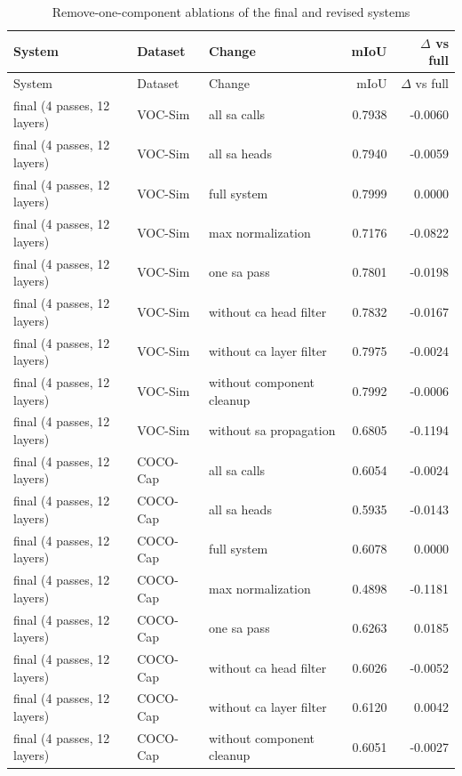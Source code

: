 {\scriptsize\setlength{\tabcolsep}{3pt}
\begin{longtable}{>{\raggedright\arraybackslash}p{4.94cm}>{\raggedright\arraybackslash}p{1.92cm}>{\raggedright\arraybackslash}p{4.68cm}rr}
\caption{Remove-one-component ablations of the final and revised systems}\label{tab:b_component_ablations}\\
\toprule
System & Dataset & Change & mIoU & $\Delta$ vs full \\
\midrule
\endfirsthead
\toprule
System & Dataset & Change & mIoU & $\Delta$ vs full \\
\midrule
\endhead
final (4 passes, 12 layers) & VOC-Sim & all sa calls & 0.7938 & -0.0060 \\
final (4 passes, 12 layers) & VOC-Sim & all sa heads & 0.7940 & -0.0059 \\
final (4 passes, 12 layers) & VOC-Sim & full system & 0.7999 & 0.0000 \\
final (4 passes, 12 layers) & VOC-Sim & max normalization & 0.7176 & -0.0822 \\
final (4 passes, 12 layers) & VOC-Sim & one sa pass & 0.7801 & -0.0198 \\
final (4 passes, 12 layers) & VOC-Sim & without ca head filter & 0.7832 & -0.0167 \\
final (4 passes, 12 layers) & VOC-Sim & without ca layer filter & 0.7975 & -0.0024 \\
final (4 passes, 12 layers) & VOC-Sim & without component cleanup & 0.7992 & -0.0006 \\
final (4 passes, 12 layers) & VOC-Sim & without sa propagation & 0.6805 & -0.1194 \\
final (4 passes, 12 layers) & COCO-Cap & all sa calls & 0.6054 & -0.0024 \\
final (4 passes, 12 layers) & COCO-Cap & all sa heads & 0.5935 & -0.0143 \\
final (4 passes, 12 layers) & COCO-Cap & full system & 0.6078 & 0.0000 \\
final (4 passes, 12 layers) & COCO-Cap & max normalization & 0.4898 & -0.1181 \\
final (4 passes, 12 layers) & COCO-Cap & one sa pass & 0.6263 & 0.0185 \\
final (4 passes, 12 layers) & COCO-Cap & without ca head filter & 0.6026 & -0.0052 \\
final (4 passes, 12 layers) & COCO-Cap & without ca layer filter & 0.6120 & 0.0042 \\
final (4 passes, 12 layers) & COCO-Cap & without component cleanup & 0.6051 & -0.0027 \\

\end{longtable}}
